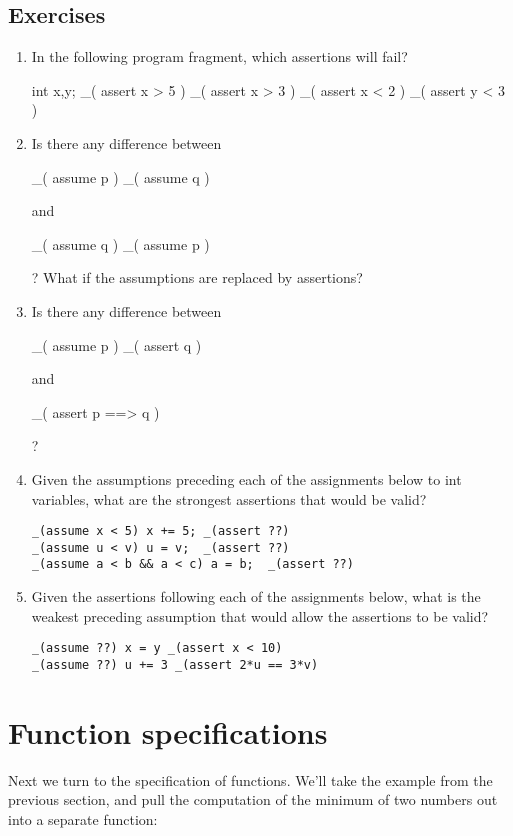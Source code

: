 \subsection*{Exercises}
\begin{enumerate}
\item
In the following program fragment, which assertions will fail?
\begin{VCC}
int x,y; 
_( assert x > 5 ) 
_( assert x > 3 ) 
_( assert x < 2 ) 
_( assert y < 3 )
\end{VCC}
\item
Is there any difference between 
\begin{VCC}
_( assume p ) _( assume q  )
\end{VCC}
and 
\begin{VCC}
_( assume q ) _( assume p )
\end{VCC}
? What if the assumptions are replaced by assertions?
\item
Is there any difference between
\begin{VCC}
_( assume p ) _( assert q )
\end{VCC}
and 
\begin{VCC}
_( assert p ==> q )
\end{VCC}
? 
\item
Given the assumptions preceding each of the assignments below to int
variables, what are the strongest assertions that would be valid?
\begin{lstlisting}
_(assume x < 5) x += 5; _(assert ??)
_(assume u < v) u = v;  _(assert ??)
_(assume a < b && a < c) a = b;  _(assert ??)
\end{lstlisting}
\item
Given the assertions following each of the assignments below, what is 
the weakest preceding assumption that would allow the assertions to be
valid?
\begin{lstlisting}
_(assume ??) x = y _(assert x < 10)
_(assume ??) u += 3 _(assert 2*u == 3*v)
\end{lstlisting}
\end{enumerate}

\section{Function specifications}
\label{sect:functions}

Next we turn to the specification of functions. We'll take the example
from the previous section, and pull the computation of the minimum of
two numbers out into a separate function:


